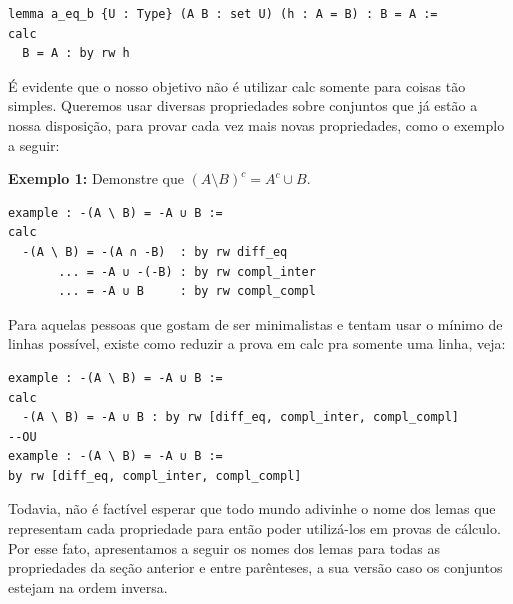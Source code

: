 \begin{lstlisting}
lemma a_eq_b {U : Type} (A B : set U) (h : A = B) : B = A :=
calc
  B = A : by rw h \end{lstlisting}

É evidente que o nosso objetivo não é utilizar {\selectfont calc} somente para coisas tão simples. Queremos usar diversas propriedades sobre conjuntos que já estão a nossa disposição, para provar cada vez mais novas propriedades, como o exemplo a seguir:

\textbf{Exemplo 1:} Demonstre que $(A \setminus B)^c = A^c \cup B$.
\begin{lstlisting}
example : -(A \ B) = -A ∪ B :=
calc
  -(A \ B) = -(A ∩ -B)  : by rw diff_eq
       ... = -A ∪ -(-B) : by rw compl_inter
       ... = -A ∪ B     : by rw compl_compl \end{lstlisting}

Para aquelas pessoas que gostam de ser minimalistas e tentam usar o mínimo de linhas possível, existe como reduzir a prova em {\selectfont calc} pra somente uma linha, veja:

\begin{lstlisting}
example : -(A \ B) = -A ∪ B :=
calc
  -(A \ B) = -A ∪ B : by rw [diff_eq, compl_inter, compl_compl]
--OU
example : -(A \ B) = -A ∪ B :=
by rw [diff_eq, compl_inter, compl_compl] \end{lstlisting}

Todavia, não é factível esperar que todo mundo adivinhe o nome dos lemas que representam cada propriedade para então poder utilizá-los em provas de cálculo. Por esse fato, apresentamos a seguir os nomes dos lemas para todas as propriedades da seção anterior e entre parênteses, a sua versão caso os conjuntos estejam na ordem inversa.

